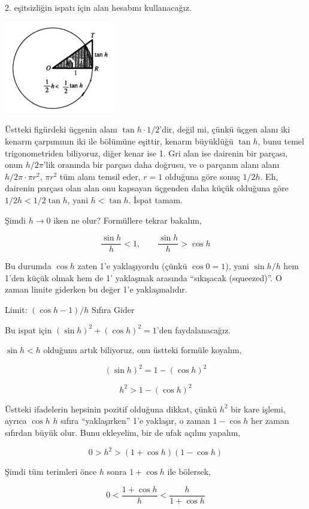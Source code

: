 \documentclass[12pt,fleqn]{article}\usepackage{../../common}
\begin{document}
2. eşitsizliğin ispatı için alan hesabını kullanacağız. 

\includegraphics[height=4cm]{ode_mattuck_93_diff_02.png}

Üstteki figürdeki üçgenin alanı $\tan h \cdot 1 / 2$'dir, değil mi, çünkü
üçgen alanı iki kenarın çarpımının iki ile bölümüne eşittir, kenarın
büyüklüğü $\tan h$, bunu temel trigonometriden biliyoruz, diğer kenar ise
1. Gri alan ise dairenin bir parçası, onun $h/2\pi$'lik oranında bir
parçası daha doğrusu, ve o parçanın alanı alanı $h/2\pi \cdot \pi r^2$,
$\pi r^2$ tüm alanı temsil eder, $r=1$ olduğuna göre sonuç $1/2 h$. Eh,
dairenin parçası olan alan onu kapsayan üçgenden daha küçük olduğuna göre
$1/2 h < 1/2 \tan h$, yani $h < \tan h$. İspat tamam.

Şimdi $h \to 0$ iken ne olur? Formüllere tekrar bakalım,

$$ \frac{\sin h}{h} < 1, \qquad  \frac{\sin h}{h} > \cos h $$

Bu durumda $\cos h$ zaten 1'e yaklaşıyordu (çünkü $\cos 0 = 1$), yani $\sin h
/ h$ hem 1'den küçük olmak hem de 1' yaklaşmak arasında ``sıkışacak
(squeezed)''. O zaman limite giderken bu değer 1'e yaklaşmalıdır.

Limit: $(\cos h -1) / h$ Sıfıra Gider

Bu ispat için $(\sin h)^2 + (\cos h)^2 = 1$'den faydalanacağız. 

$\sin h < h$ olduğunu artık biliyoruz, onu üstteki formüle koyalım,

$$ (\sin h)^2 = 1 -  (\cos h)^2$$

$$ h^2 > 1 -  (\cos h)^2$$

Üstteki ifadelerin hepsinin pozitif olduğuna dikkat, çünkü $h^2$ bir kare
işlemi, ayrıca $\cos h$ $h$ sıfıra ``yaklaşırken'' 1'e yaklaşır, o zaman
$1-\cos h$ her zaman sıfırdan büyük olur. Bunu ekleyelim, bir de ufak
açılım yapalım,

$$ 0 > h^2 > (1 + \cos h)(1 - \cos h)$$

Şimdi tüm terimleri önce $h$ sonra $1+\cos h$ ile bölersek, 

$$ 0 < \frac{1 + \cos h}{h} <  \frac{h}{1+\cos h} $$
\end{document}
